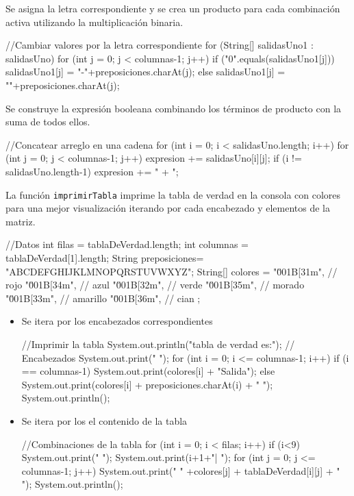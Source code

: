 Se asigna la letra correspondiente y se crea un producto para cada combinación activa utilizando la multiplicación binaria.
\begin{javaCode}
//Cambiar valores por la letra correspondiente
    for (String[] salidasUno1 : salidasUno) {
        for (int j = 0; j < columnas-1; j++) {
            if ("0".equals(salidasUno1[j])) {
                salidasUno1[j] = "-"+preposiciones.charAt(j);
            } else {
                salidasUno1[j] = ""+preposiciones.charAt(j);
            }
        }
    }
\end{javaCode}

Se construye la expresión booleana combinando los términos de producto con la suma de todos ellos.
\begin{javaCode}
//Concatear arreglo en una cadena
for (int i = 0; i < salidasUno.length; i++) {
    for (int j = 0; j < columnas-1; j++) {
        expresion += salidasUno[i][j];
    }
    if (i != salidasUno.length-1) {
        expresion += " + ";
    }
}
\end{javaCode}
La función \texttt{imprimirTabla} imprime la tabla de verdad en la consola con colores para una mejor visualización iterando por cada  encabezado y elementos de la matriz.
\begin{javaCode}
//Datos
    int filas = tablaDeVerdad.length;
    int columnas = tablaDeVerdad[1].length;
    String preposiciones= "ABCDEFGHIJKLMNOPQRSTUVWXYZ";
    String[] colores = {
        "\u001B[31m", // rojo
        "\u001B[34m", // azul
        "\u001B[32m", // verde
        "\u001B[35m", // morado
        "\u001B[33m", // amarillo
        "\u001B[36m", // cian
    };
\end{javaCode}
\newpage
\begin{itemize}
       \item[{\ieeeguilsinglright}] {\it } Se itera por los encabezados correspondientes
\begin{javaCode}    
    //Imprimir la tabla
    System.out.println("\nLa tabla de verdad es:");
    // Encabezados
    System.out.print("     ");
    for (int i = 0; i <= columnas-1; i++) {
        if (i == columnas-1) {
            System.out.print(colores[i] + "Salida");
        }else{
            System.out.print(colores[i] + preposiciones.charAt(i) + "  ");
        }
    }
    System.out.println();
\end{javaCode}
    \item[{\ieeeguilsinglright}] {\it } Se itera por los el contenido de la tabla
\begin{javaCode}
    //Combinaciones de la tabla
    for (int i = 0; i < filas; i++) {
        if (i<9) {
            System.out.print(" ");
        }
        System.out.print(i+1+"| ");
        for (int j = 0; j <= columnas-1; j++) {
            System.out.print(" " +colores[j] + tablaDeVerdad[i][j] + " ");
        }
        System.out.println();
    }
\end{javaCode}
\end{itemize}


